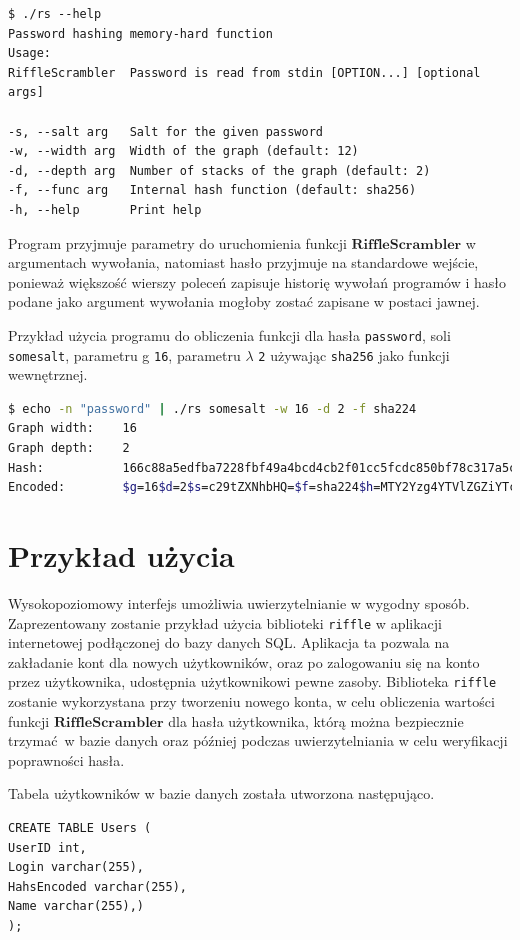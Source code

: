 \begin{lstlisting}
$ ./rs --help             
Password hashing memory-hard function
Usage:
RiffleScrambler  Password is read from stdin [OPTION...] [optional args]

-s, --salt arg   Salt for the given password
-w, --width arg  Width of the graph (default: 12)
-d, --depth arg  Number of stacks of the graph (default: 2)
-f, --func arg   Internal hash function (default: sha256)
-h, --help       Print help
\end{lstlisting}

Program przyjmuje parametry do uruchomienia funkcji $\mathbf{RiffleScrambler}$ w argumentach wywołania, natomiast hasło przyjmuje na standardowe wejście, ponieważ większość wierszy poleceń zapisuje historię wywołań programów i hasło podane jako argument wywołania mogłoby zostać zapisane w postaci jawnej.

Przykład użycia programu do obliczenia funkcji dla hasła \texttt{password}, soli \texttt{somesalt}, parametru g \texttt{16}, parametru $\lambda$ \texttt{2} używając \texttt{sha256} jako funkcji wewnętrznej.
\begin{lstlisting}[language=bash]
$ echo -n "password" | ./rs somesalt -w 16 -d 2 -f sha224
Graph width:	16
Graph depth:	2
Hash:       	166c88a5edfba7228fbf49a4bcd4cb2f01cc5fcdc850bf78c317a5c8
Encoded:    	$g=16$d=2$s=c29tZXNhbHQ=$f=sha224$h=MTY2Yzg4YTVlZGZiYTcyMjhmYmY0(...)
\end{lstlisting}

\section{Przykład użycia}
Wysokopoziomowy interfejs umożliwia uwierzytelnianie w wygodny sposób.
Zaprezentowany zostanie przykład użycia biblioteki \texttt{riffle} w aplikacji internetowej
podłączonej do bazy danych SQL. Aplikacja ta pozwala na zakładanie kont dla nowych użytkowników, oraz po zalogowaniu się na konto przez użytkownika, udostępnia użytkownikowi pewne zasoby.
Biblioteka \texttt{riffle} zostanie wykorzystana przy tworzeniu nowego konta, w celu obliczenia wartości funkcji $\mathbf{RiffleScrambler}$ dla hasła użytkownika, którą można bezpiecznie trzymać w bazie danych oraz później podczas uwierzytelniania w celu weryfikacji poprawności hasła.


Tabela użytkowników w bazie danych została utworzona następująco.
\begin{verbatim}
CREATE TABLE Users (
UserID int,
Login varchar(255),
HahsEncoded varchar(255),
Name varchar(255),)
);
\end{verbatim}

